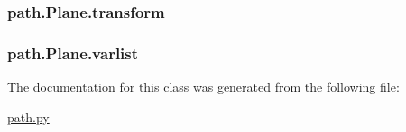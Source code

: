 \subsubsection[{transform}]{\setlength{\rightskip}{0pt plus 5cm}path.\+Plane.\+transform}\label{classpath_1_1_plane_a2fa8b34d6558289254bb548239672db0}
\hypertarget{classpath_1_1_plane_a17bfb0110c1141d362eb715129058fa4}{}
\subsubsection[{varlist}]{\setlength{\rightskip}{0pt plus 5cm}path.\+Plane.\+varlist}\label{classpath_1_1_plane_a17bfb0110c1141d362eb715129058fa4}


The documentation for this class was generated from the following file\+:\begin{DoxyCompactItemize}
\item 
\hyperlink{path_8py}{path.\+py}\end{DoxyCompactItemize}
